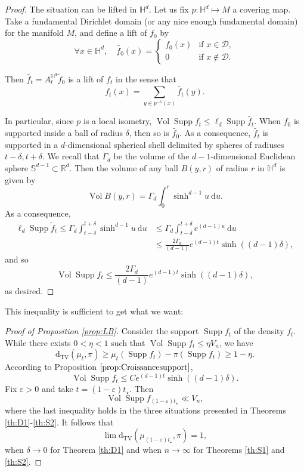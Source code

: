 \documentclass[]{scrartcl}
\newcommand{\DTV}{\mathrm{d_{TV}}}
\newcommand{\R}{\mathds{R}}
\renewcommand{\d}{\mathrm{d}}
\DeclareMathOperator{\Supp}{Supp}
\DeclareMathOperator{\Vol}{Vol}
\numberwithin{equation}{section}
\numberwithin{figure}{section}
\begin{document}
\begin{proof}
	The situation can be lifted in $\mathds H^d$. Let us fix $p\colon \mathds H^d \mapsto M$ a covering map. Take a {fundamental Dirichlet domain (or any nice enough fundamental domain)} for the manifold $M$, and define a lift of $f_0$ by \[\forall x \in \mathds H^d, \quad \widetilde{f_0}(x) = \begin{cases} f_0(x)& \text{if $x \in \mathcal D$},\\0& \text{if $x \notin \mathcal D$.} \end{cases}\]

	Then $\widetilde{f_t} = A_t^{\mathds H^d}\widetilde{f}_0$ is a lift of $f_t$ in the sense that \[f_t(x) = \sum_{y\in p^{-1}(x)}^{} \widetilde{f_t}(y).\]
	
	In particular, since $p$ is a local isometry, $\Vol \Supp f_t \leq \ell_d \Supp \widetilde{f_t}$. When $f_0$ is supported inside a ball of radius $\delta$, then so is $\widetilde{f_0}$. As a consequence, $\widetilde{f_t}$ is supported in a $d$-dimensional spherical shell delimited by spheres of radiuses $t-\delta, t+\delta$. We recall that $\Gamma_d$ be the volume of the $d-1$-dimensional Euclidean sphere $\mathds S^{d-1}\subset \R^{d}$. Then the volume of any ball $B(y, r)$ of radius $r$ in $\mathds H^d$ is given by \[\Vol B(y, r) = \Gamma_d \int_0^{r}\sinh^{d-1} u\ \d u.\] As a consequence, \begin{align*} \ell_d \Supp \widetilde{f}_t \leq \Gamma_d \int_{t-\delta}^{t+\delta}\sinh^{d-1} u\ \d u &\leq {\Gamma_d}{} \int_{t-\delta}^{t+\delta}e^{(d-1)u} \ \d u\\ &\leq \frac{2\Gamma_d}{(d-1)} e^{(d-1) t} \sinh\left((d-1)\delta\right),
	\end{align*} and so  \[\Vol \Supp f_t \leq \frac{2\Gamma_d}{(d-1)} e^{(d-1) t} \sinh\left((d-1)\delta\right),\] as desired.
\end{proof}

This inequality is sufficient to get what we want:

\begin{proof}[Proof of Proposition \ref{prop:LB}]
	Consider the support $\Supp f_t$ of the density $f_t$. While there exists $0<\eta<1$ such that $\Vol \Supp f_t \leq \eta V_n$, we have  \[\DTV\left( \mu_{t}, \pi \right) \geq  \mu_t(\Supp f_t)-\pi(\Supp f_t) \geq 1 -\eta.\]
	According to Proposition $\ref{prop:Croissancesupport}$, \[\Vol \Supp f_t \leq Ce^{(d-1)t}\sinh\left((d-1) \delta\right).\] Fix $\varepsilon>0$ and take $t = (1-\varepsilon)t_{\star}$. Then
	\begin{equation*}\label{eq:suppft}
		\Vol \Supp f_{\left(1-\varepsilon\right)t_{\star}} \ll V_n,
	\end{equation*} where the last inequality holds in the three situations presented in Theorems \ref{th:D1}-\ref{th:S2}. It follows that \[\lim \DTV\left( \mu_{(1-\varepsilon)t_\star}, \pi \right) = 1,\] when $\delta \to 0$ for Theorem \ref{th:D1} and when $n\to\infty$ for Theorems \ref{th:S1} and \ref{th:S2}.
\end{proof}
\end{document}

